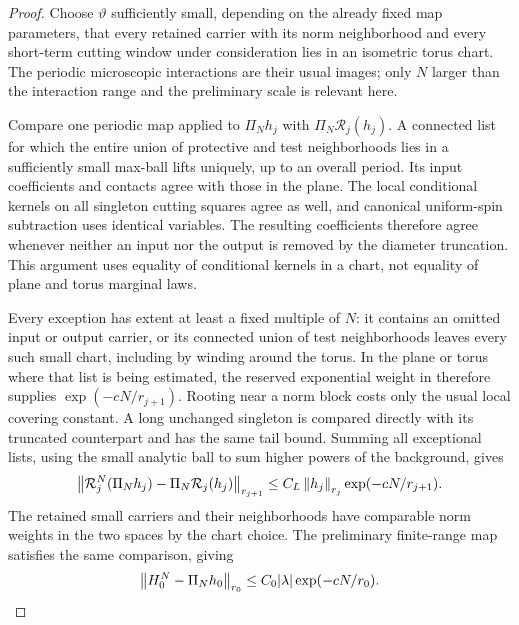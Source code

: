 \begin{proof}
Choose $\vartheta$ sufficiently small, depending on the already fixed
map parameters, that every retained carrier with its norm neighborhood
and every short-term cutting window under consideration lies in an
isometric torus chart.  The periodic microscopic interactions are
their usual images; only $N$ larger than the interaction range and
the preliminary scale is relevant here.

Compare one periodic map applied to $\Pi_Nh_j$ with
$\Pi_N\mathcal R_j(h_j)$.  A connected list for which the entire
union of protective and test neighborhoods lies in a sufficiently
small max-ball lifts uniquely, up to an overall period.  Its input
coefficients and contacts agree with those in the plane.  The local
conditional kernels on all singleton cutting squares agree as well,
and canonical uniform-spin subtraction uses identical variables.
The resulting coefficients therefore agree whenever neither an input
nor the output is removed by the diameter truncation.  This argument
uses equality of conditional kernels in a chart, not equality of
plane and torus marginal laws.

Every exception has extent at least a fixed multiple of $N$: it
contains an omitted input or output carrier, or its connected union
of test neighborhoods leaves every such small chart, including by
winding around the torus.  In the plane or torus where that list is
being estimated, the reserved exponential weight in 
therefore supplies $\exp(-cN/r_{j+1})$.  Rooting near a norm block
costs only the usual local covering constant.  A long unchanged
singleton is compared directly with its truncated counterpart and
has the same tail bound.  Summing all exceptional lists, using the
small analytic ball to sum higher powers of the background, gives
\begin{equation}\label{flow:torus-forcing}
 \left\|\mathcal R_j^N(\Pi_Nh_j)
                   -\Pi_N\mathcal R_j(h_j)\right\|_{r_{j+1}}
        \le C_L\left\|h_j\right\|_{r_j}\exp(-cN/r_{j+1}).
\end{equation}
The retained small carriers and their neighborhoods have comparable
norm weights in the two spaces by the chart choice.  The preliminary
finite-range map satisfies the same comparison, giving
\begin{equation}\label{flow:torus-initial}
              \left\|H_0^N-\Pi_Nh_0\right\|_{r_0}
                    \le C_0|\lambda|\exp(-cN/r_0).
\end{equation}


\end{proof}
